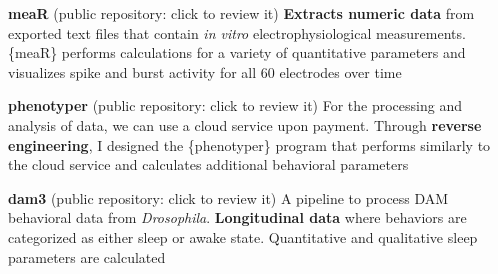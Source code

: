 \documentclass[
  a4paper, 
   maincolor=cvblue,
   sectioncolor=cvblue,
]{fortysecondscv}
\begin{document}

\textbf{meaR} (public repository: click \href{https://github.com/adrianclo/meaR}{\color{blue}{here}} to review it) \newline
\textbf{Extracts numeric data} from exported \href{https://www.multichannelsystems.com/products/vitro-mea-systems}{\color{blue}{Micro-Electrode Arrays}} text files that contain \emph{in vitro} electrophysiological measurements. \{meaR\} performs calculations for a variety of quantitative parameters and visualizes spike and burst activity for all 60 electrodes over time \newline

\textbf{phenotyper} (public repository: click \href{https://github.com/adrianclo/phenotyper}{\color{blue}{here}} to review it) \newline
For the processing and analysis of \href{https://www.sylics.com/bioinformatics/cognitionwall/}{\color{blue}{Phenotyper}} data, we can use a cloud service upon payment. Through \textbf{reverse engineering}, I designed the \{phenotyper\} program that performs similarly to the cloud service and calculates additional behavioral parameters \newline

\textbf{dam3} (public repository: click \href{https://github.com/adrianclo/dam3}{\color{blue}{here}} to review it) \newline
A pipeline to process \href{https://trikinetics.com}{\color{blue}{Trikinetics}} DAM behavioral data from \emph{Drosophila}. \textbf{Longitudinal data} where behaviors are categorized as either sleep or awake state. Quantitative and qualitative sleep parameters are calculated \newline
\end{document}
